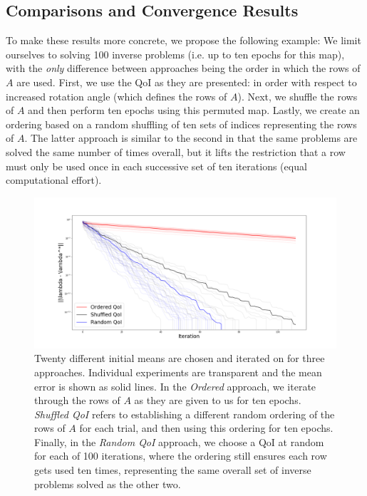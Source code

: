 \subsection{Comparisons and Convergence Results}
To make these results more concrete, we propose the following example:
We limit ourselves to solving 100 inverse problems (i.e. up to ten epochs for this map), with the \emph{only} difference between approaches being the order in which the rows of $A$ are used.
First, we use the QoI as they are presented: in order with respect to increased rotation angle (which defines the rows of $A$).
Next, we shuffle the rows of $A$ and then perform ten epochs using this permuted map.
Lastly, we create an ordering based on a random shuffling of ten sets of indices representing the rows of $A$.
The latter approach is similar to the second in that the same problems are solved the same number of times overall, but it lifts the restriction that a row must only be used once in each successive set of ten iterations (equal computational effort).

\begin{figure}
  \centering
  \includegraphics[width=0.95\linewidth]{examples/iterative/10D-convergence-comparison.png}
  \caption{
  Twenty different initial means are chosen and iterated on for three approaches.
  Individual experiments are transparent and the mean error is shown as solid lines.
  In the \emph{Ordered} approach, we iterate through the rows of $A$ as they are given to us for ten epochs.
  \emph{Shuffled QoI} refers to establishing a different random ordering of the rows of $A$ for each trial, and then
  using this ordering for ten epochs.
  Finally, in the \emph{Random QoI} approach, we choose a QoI at random for each of 100 iterations, where the ordering still ensures each row gets used ten times, representing the same overall set of inverse problems solved as the other two.
  }
  \label{fig:iterative-convergence-comparison}
\end{figure}

